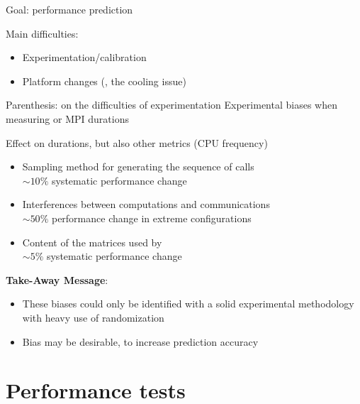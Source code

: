 \documentclass[10pt]{beamer}
\begin{document}
\begin{frame}[plain]
    \begin{LARGE}
        Goal: performance prediction~~~\alert{\textbf{\Huge \checkmark}}
    \end{LARGE}
    \medbreak
    \pause

    Main difficulties:
    \begin{itemize}
        \item Experimentation/calibration
        \item Platform changes (\eg, the cooling issue)
    \end{itemize}
\end{frame}

\begin{frame}{Parenthesis: on the difficulties of experimentation}
    \alert{Experimental biases} when measuring \dgemm or MPI durations

    Effect on durations, but also other metrics (\eg CPU frequency)
    \onslide<+->
    \begin{itemize}[<+->]
        \item Sampling method for generating the sequence of calls\\
             \alert{\(\sim 10\%\)} systematic performance change
        \item Interferences between computations and communications\\
             \alert{\(\sim 50\%\)} performance change in extreme configurations
        \item Content of the matrices used by \dgemm\\
             \alert{\(\sim 5\%\)} systematic performance change
    \end{itemize}

    \onslide<+->
    \textbf{Take-Away Message}:
    \begin{itemize}
        \item These biases could only be identified with a solid experimental \alert{methodology} with heavy use of
            \alert{randomization}
        \item Bias may be desirable, to increase \alert{prediction accuracy}
    \end{itemize}
\end{frame}


\section{Performance tests}%
\end{document}
